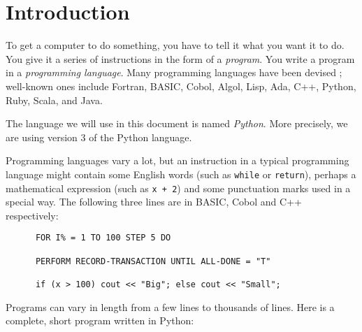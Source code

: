 \section{Introduction}


To get a computer to do something, you have to tell it what you want it
to do.  You give it a series of instructions in the form of a \emph{program}.
You write a program in a \emph{programming language}.
Many programming languages have been devised ;
well-known ones include
Fortran, BASIC, Cobol, Algol, Lisp, Ada, C++, Python, Ruby, Scala, and Java.


The language we will use in this document is named \emph{Python}.
More precisely, we are using version 3 of the Python language.

Programming languages vary a lot, but
an instruction in a typical programming language might contain
some English words (such as \verb!while! or \verb!return!), perhaps a mathematical
expression (such as \verb!x + 2!) and some punctuation marks used in a special way.
The following three lines are in BASIC, Cobol and C++ respectively:
\begin{Verbatim}
      FOR I% = 1 TO 100 STEP 5 DO

      PERFORM RECORD-TRANSACTION UNTIL ALL-DONE = "T"

      if (x > 100) cout << "Big"; else cout << "Small";
\end{Verbatim}

Programs can vary in length from a few lines to thousands of lines.
Here is a complete, short program written in Python:

